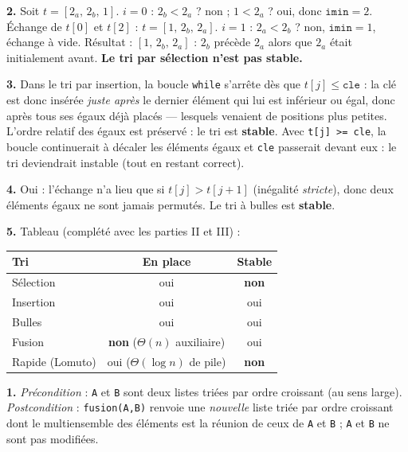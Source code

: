 \documentclass[11pt,a4paper]{article}
\begin{document}
\textbf{2.} Soit $t=[2_a,\,2_b,\,1]$.
$i=0$ : $2_b<2_a$ ? non ; $1<2_a$ ? oui, donc $\texttt{imin}=2$. Échange de $t[0]$ et
$t[2]$ : $t=[1,\,2_b,\,2_a]$.
$i=1$ : $2_a<2_b$ ? non, $\texttt{imin}=1$, échange à vide.
Résultat : $[1,\,2_b,\,2_a]$ : $2_b$ précède $2_a$ alors que $2_a$ était initialement
avant. \textbf{Le tri par sélection n'est pas stable.}

\textbf{3.} Dans le tri par insertion, la boucle \texttt{while} s'arrête dès que
$t[j]\le\texttt{cle}$ : la clé est donc insérée \emph{juste après} le dernier élément qui
lui est inférieur ou égal, donc après tous ses égaux déjà placés --- lesquels venaient de
positions plus petites. L'ordre relatif des égaux est préservé : le tri est
\textbf{stable}. Avec \texttt{t[j] >= cle}, la boucle continuerait à décaler les éléments
égaux et \texttt{cle} passerait devant eux : le tri deviendrait instable (tout en restant
correct).

\textbf{4.} Oui : l'échange n'a lieu que si $t[j]>t[j+1]$ (inégalité \emph{stricte}),
donc deux éléments égaux ne sont jamais permutés. Le tri à bulles est \textbf{stable}.

\textbf{5.} Tableau (complété avec les parties II et III) :
\begin{center}\small
\begin{tabular}{|l|c|c|}
\hline
\textbf{Tri} & \textbf{En place} & \textbf{Stable} \\\hline
Sélection & oui & \textbf{non} \\\hline
Insertion & oui & oui \\\hline
Bulles & oui & oui \\\hline
Fusion & \textbf{non} ($\Theta(n)$ auxiliaire) & oui \\\hline
Rapide (Lomuto) & oui ($\Theta(\log n)$ de pile) & \textbf{non} \\\hline
\end{tabular}
\end{center}


\reponse
\textbf{1.} \emph{Précondition} : \texttt{A} et \texttt{B} sont deux listes triées par
ordre croissant (au sens large).
\emph{Postcondition} : \texttt{fusion(A,B)} renvoie une \emph{nouvelle} liste triée par
ordre croissant dont le multiensemble des éléments est la réunion de ceux de \texttt{A}
et \texttt{B} ; \texttt{A} et \texttt{B} ne sont pas modifiées.
\end{document}
